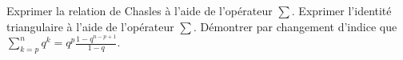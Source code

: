 %
%
	\begin{tasks}
		\task Exprimer  la relation de Chasles à l'aide de l'opérateur $\sum$.
		\task Exprimer  l'identité triangulaire à l'aide de l'opérateur $\sum$.
		\task Démontrer par changement d'indice que $ \sum\limits_{k=p}^n q^k = q^p\frac{1 - q^{n-p+1}}{1-q}$.
	\end{tasks}
